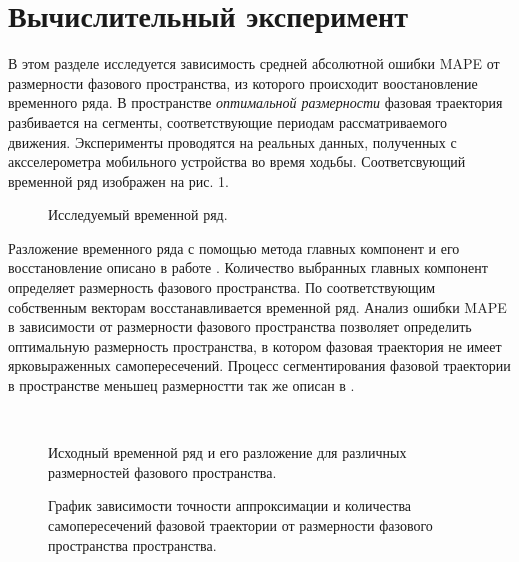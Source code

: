 \documentclass[12pt, twoside]{article}
\begin{document}
\section{Вычислительный эксперимент}
В этом разделе исследуется зависимость средней абсолютной ошибки MAPE от размерности фазового пространства, из которого происходит воостановление временного ряда. В пространстве \emph{оптимальной размерности} фазовая траектория разбивается на сегменты, соответствующие периодам рассматриваемого движения. Эксперименты проводятся на реальных данных, полученных с аксселерометра мобильного устройства во время ходьбы. Соответсвующий временной ряд изображен на рис. 1.

    \begin{figure}[h!]
	    \caption{Исследуемый временной ряд.}
    \end{figure}
    
Разложение временного ряда с помощью метода главных компонент и его восстановление описано в работе \cite{motrenko2015extracting}. Количество выбранных главных компонент определяет размерность фазового пространства. По соответствующим собственным векторам восстанавливается временной ряд. Анализ ошибки MAPE в зависимости от размерности фазового пространства позволяет определить оптимальную размерность пространства, в котором фазовая траектория не имеет ярковыраженных самопересечений. Процесс сегментирования фазовой траектории в пространстве меньшец размерностти так же описан в \cite{motrenko2015extracting}.
    
    \begin{figure}[ht]
        \\
        \caption{Исходный временной ряд и его разложение для различных размерностей фазового пространства.}
        \label{fg:mod}
    \end{figure}

    
    \begin{figure}[ht]
	    \caption{График зависимости точности аппроксимации и количества самопересечений фазовой траектории от размерности фазового пространства пространства.}
    \end{figure}
    
\end{document}
